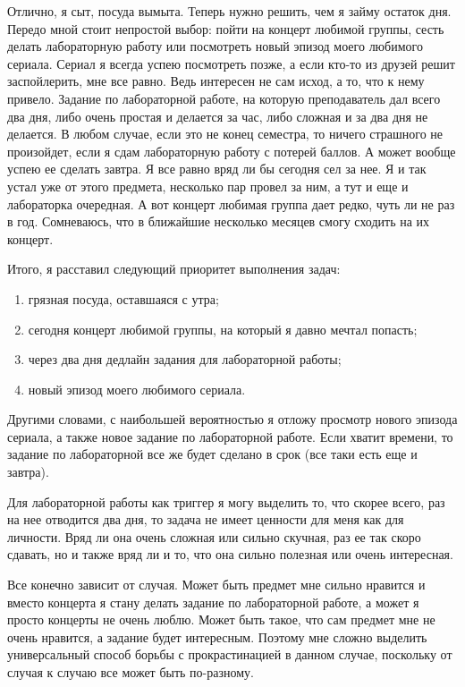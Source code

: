 \documentclass[a4paper, 14pt]{extarticle}
\begin{document}
Отлично, я сыт, посуда вымыта. Теперь нужно решить, чем я займу остаток дня.
Передо мной стоит непростой выбор: пойти на концерт любимой группы, сесть
делать лабораторную работу или посмотреть новый эпизод моего любимого сериала.
Сериал я всегда успею посмотреть позже, а если кто-то из друзей решит
заспойлерить, мне все равно. Ведь интересен не сам исход, а то, что к нему
привело. Задание по лабораторной работе, на которую преподаватель дал всего два
дня, либо очень простая и делается за час, либо сложная и за два дня не
делается. В любом случае, если это не конец семестра, то ничего страшного не
произойдет, если я сдам лабораторную работу с потерей баллов. А может вообще
успею ее сделать завтра. Я все равно вряд ли бы сегодня сел за нее. Я и так
устал уже от этого предмета, несколько пар провел за ним, а тут и еще и
лабораторка очередная. А вот концерт любимая группа дает редко, чуть ли не раз
в год. Сомневаюсь, что в ближайшие несколько месяцев смогу сходить на их
концерт.

Итого, я расставил следующий приоритет выполнения задач:
\begin{enumerate}
  \item грязная посуда, оставшаяся с утра;
  \item сегодня концерт любимой группы, на который я давно мечтал попасть;
  \item через два дня дедлайн задания для лабораторной работы;
  \item новый эпизод моего любимого сериала.
\end{enumerate}

Другими словами, с наибольшей вероятностью я отложу просмотр нового эпизода
сериала, а также новое задание по лабораторной работе. Если хватит времени, то
задание по лабораторной все же будет сделано в срок (все таки есть еще и
завтра).

Для лабораторной работы как триггер я могу выделить то, что скорее всего, раз
на нее отводится два дня, то задача не имеет ценности для меня как для
личности. Вряд ли она очень сложная или сильно скучная, раз ее так скоро
сдавать, но и также вряд ли и то, что она сильно полезная или очень интересная.

Все конечно зависит от случая. Может быть предмет мне сильно нравится и вместо
концерта я стану делать задание по лабораторной работе, а может я просто
концерты не очень люблю. Может быть такое, что сам предмет мне не очень
нравится, а задание будет интересным. Поэтому мне сложно выделить универсальный
способ борьбы с прокрастинацией в данном случае, поскольку от случая к случаю
все может быть по-разному.
\end{document}
